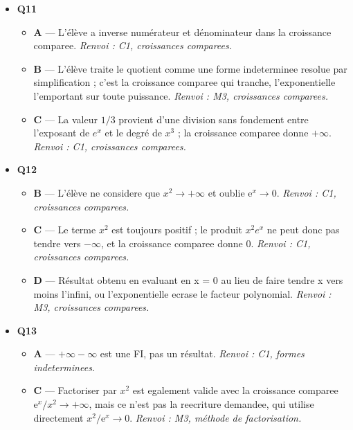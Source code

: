 \begin{itemize}
\begin{itemize}
    \item \textbf{B} — $f(5)$ n'est pas défini en general, la limite n'est pas une valeur. \emph{Renvoi : C2, définition AV.}
    \item \textbf{D} — Une limite infinie en 5 signifie que la courbe s'echappe vers le bas au voisinage de 5, elle ne coupe pas l'axe des abscisses en ce point. \emph{Renvoi : M2, étape 2.}
  \end{itemize}
  \item \textbf{Q11}
  \begin{itemize}
    \item \textbf{A} — L'élève a inverse numérateur et dénominateur dans la croissance comparee. \emph{Renvoi : C1, croissances comparees.}
    \item \textbf{B} — L'élève traite le quotient comme une forme indeterminee resolue par simplification ; c'est la croissance comparee qui tranche, l'exponentielle l'emportant sur toute puissance. \emph{Renvoi : M3, croissances comparees.}
    \item \textbf{C} — La valeur $1/3$ provient d'une division sans fondement entre l'exposant de $e^x$ et le degré de $x^3$ ; la croissance comparee donne $+\infty$. \emph{Renvoi : C1, croissances comparees.}
  \end{itemize}
  \item \textbf{Q12}
  \begin{itemize}
    \item \textbf{B} — L'élève ne considere que $x^2 \to +\infty$ et oublie $\mathrm{e}^x \to 0$. \emph{Renvoi : C1, croissances comparees.}
    \item \textbf{C} — Le terme $x^2$ est toujours positif ; le produit $x^2e^x$ ne peut donc pas tendre vers $-\infty$, et la croissance comparee donne $0$. \emph{Renvoi : C1, croissances comparees.}
    \item \textbf{D} — Résultat obtenu en evaluant en x = 0 au lieu de faire tendre x vers moins l'infini, ou l'exponentielle ecrase le facteur polynomial. \emph{Renvoi : M3, croissances comparees.}
  \end{itemize}
  \item \textbf{Q13}
  \begin{itemize}
    \item \textbf{A} — $+\infty - \infty$ est une FI, pas un résultat. \emph{Renvoi : C1, formes indeterminees.}
    \item \textbf{C} — Factoriser par $x^2$ est egalement valide avec la croissance comparee $\mathrm{e}^x/x^2 \to +\infty$, mais ce n'est pas la reecriture demandee, qui utilise directement $x^2/\mathrm{e}^x \to 0$. \emph{Renvoi : M3, méthode de factorisation.}

\end{itemize}
\end{itemize}
